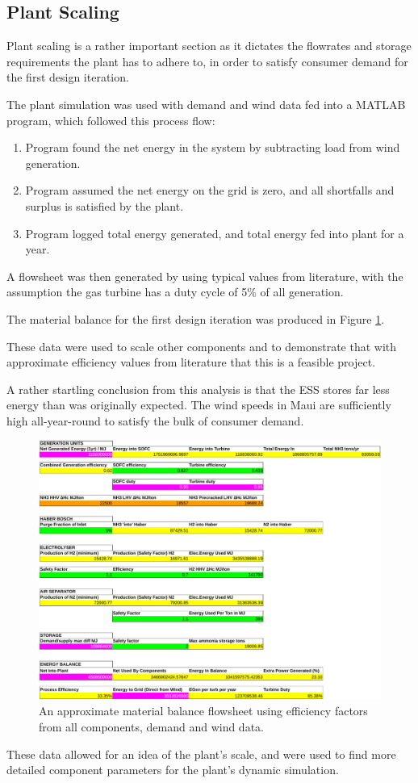 \subsection{Plant Scaling}
\label{sec:plantscale}

Plant scaling is a rather important section as it dictates the flowrates and storage requirements the plant has to adhere to, in order to satisfy consumer demand for the first design iteration.

The plant simulation was used with demand and wind data fed into a MATLAB program, which followed this process flow:
\begin{enumerate}
    \item Program found the net energy in the system by subtracting load from wind generation.
    \item Program assumed the net energy on the grid is zero, and all shortfalls and surplus is satisfied by the plant.
    \item Program logged total energy generated, and total energy fed into plant for a year.
\end{enumerate}

A flowsheet was then generated by using typical values from literature, with the assumption the gas turbine has a duty cycle of 5\% of all generation.

The material balance for the first design iteration was produced in Figure \ref{flowsheettbl}.

These data were used to scale other components and to demonstrate that with approximate efficiency values from literature that this is a feasible project.

A rather startling conclusion from this analysis is that the ESS stores far less energy than was originally expected.
The wind speeds in Maui are sufficiently high all-year-round to satisfy the bulk of consumer demand.

\begin{figure}[tbh]
    \centering
    \includegraphics[scale=0.9]{images/flowtable.pdf}
    \caption{An approximate material balance flowsheet using efficiency factors from all components, demand and wind data.}
    \label{flowsheettbl}
\end{figure}

These data allowed for an idea of the plant's scale, and were used to find more detailed component parameters for the plant's dynamic simulation. 
